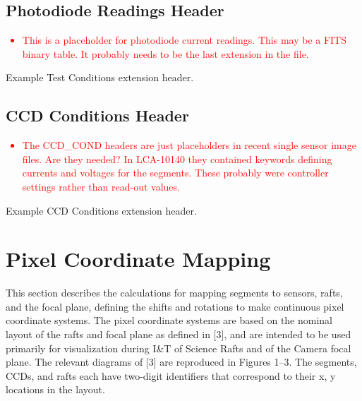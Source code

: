 \documentclass{article}[12pt]
\newcommand{\red}{\textcolor{red}}
\begin{document}
\subsection{Photodiode Readings Header}

\red{
\begin{itemize}
\item{This is a placeholder for photodiode current readings.  This may be a FITS binary table.  It probably needs to be the last extension in the file.}
\end{itemize}
}

\begin{table}
\begin{alltt}

\end{alltt}
\caption{Example Test Conditions extension header.\label{table:test_cond}}
\end{table}

\subsection{CCD Conditions Header}

\red{
\begin{itemize}
\item{The CCD\_COND headers are just placeholders in recent single sensor image files.  Are they needed?  In LCA-10140 they contained keywords defining currents and voltages for the segments.  These probably were controller settings rather than read-out values.}
\end{itemize}
}

\begin{table}
\begin{alltt}

\end{alltt}
\caption{Example CCD Conditions extension header.\label{table:ccd_cond}}
\end{table}


\section{Pixel Coordinate Mapping\label{sec:pixelcoords}}
This section describes the calculations for mapping segments to sensors, rafts, and the focal plane, defining the shifts and rotations to make continuous pixel coordinate systems.  The pixel coordinate systems are based on the nominal layout of the rafts and focal plane as defined in [3], and are intended to be used primarily for visualization during I\&T of Science Rafts and of the Camera focal plane.  The relevant diagrams of [3] are reproduced in Figures 1--3.  The segments, CCDs, and rafts each have two-digit identifiers that correspond to their x, y locations in the layout.
\end{document}
